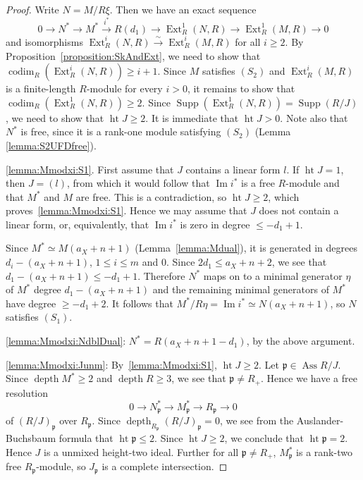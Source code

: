 \documentclass[10pt,a4paper]{amsart}
\DeclareMathOperator{\Ass}{Ass}
\DeclareMathOperator{\Ext}{Ext}
\DeclareMathOperator{\Supp}{Supp}
\DeclareMathOperator{\codim}{codim}
\DeclareMathOperator{\depth}{depth}
\newcommand{\frakp}{{\mathfrak p}}
\DeclareMathOperator{\height}{ht}
\DeclareMathOperator{\image}{Im}
\begin{document}
\begin{proof}
%
Write $N=M/R\xi$. Then we have an exact sequence
\[
0 \to N^* \to M^* \stackrel{i^*}\to R(d_1) \to \Ext^1_R(N,R) \to 
\Ext^1_R(M,R) \to 0
\]
and isomorphisms $\Ext^i_R(N,R) \stackrel\sim\to \Ext^i_R(M,R)$ for all $i
\geq 2$.
By Proposition~\ref{proposition:SkAndExt}, we need to show that 
$\codim_R(\Ext_R^i(N,R)) \geq i+1$.
Since $M$ satisfies $(S_2)$ and 
$\Ext_R^i(M,R )$ is a finite-length $R$-module for every $i>0$, 
it remains to show that $\codim_R(\Ext_R^1(N,R)) \geq 2$.
Since $\displaystyle\Supp \left(\Ext_R^1(N,R) \right ) = \Supp (R/J)$, we
need to show that $\height J \geq 2$.
It is immediate that $\height J >0$.
Note also that $N^*$ is free, since it is a rank-one module satisfying
$(S_2)$ (Lemma \ref{lemma:S2UFDfree}).

\eqref{lemma:Mmodxi:S1}. First assume that $J$ contains a linear form $l$.
If $\height J = 1$, then $J = (l)$, from which it would follow that
$\image i^*$ is a free $R$-module and that $M^*$ and $M$ are free.
This is a contradiction, so $\height J \geq 2$, which
proves~\eqref{lemma:Mmodxi:S1}.
Hence we may assume that $J$ does not contain a linear form, or,
equivalently, that $\image i^*$ is zero in degree $\leq -d_1+1$.

Since $M^* \simeq M(a_X +n + 1)$ (Lemma~\ref{lemma:Mdual}),
it is generated in degrees
$d_i - (a_X + n + 1)$, $1 \leq i \leq m$ and $0$.
Since $2d_1 \leq a_X + n + 2$, we see that
$d_1 - (a_X + n + 1) \leq -d_1+1$.
Therefore $N^*$ maps on to a minimal generator $\eta$ of $M^*$ degree 
$d_1 - (a_X + n + 1)$ and the remaining minimal generators of $M^*$ 
have degree $\geq -d_1+2$. 
It follows that 
$M^*/R\eta = \image i^* \simeq N(a_X+n+1)$, so $N$ satisfies $(S_1)$.

\eqref{lemma:Mmodxi:NdblDual}:
$N^* = R(a_X+n+1-d_1)$, by the above argument. 

\eqref{lemma:Mmodxi:Junm}:
By~\eqref{lemma:Mmodxi:S1}, $\height J \geq 2$.
Let $\frakp \in \Ass R/J$. 
Since $\depth M^* \geq 2$ and $\depth R \geq 3$, 
we see that $\frakp \neq R_+$.
Hence we have a free resolution
\[
0 \to N_\frakp^* \to M_\frakp^* \to R_\frakp \to  0
\]
of $(R/J)_{\frakp}$ over $R_\frakp$. Since $\depth_{R_\frakp } 
(R/J)_{\frakp} = 0$, we see from the Auslander-Buchsbaum formula that
$\height \frakp \leq 2$. Since $\height J \geq 2$, we conclude that
$\height \frakp = 2$. Hence $J$ is a unmixed height-two ideal.
Further for all $\frakp \neq R_+$, $M_\frakp^*$ is a rank-two free
$R_\frakp$-module, so $J_\frakp$ is a complete intersection.
\end{proof}
\end{document}
